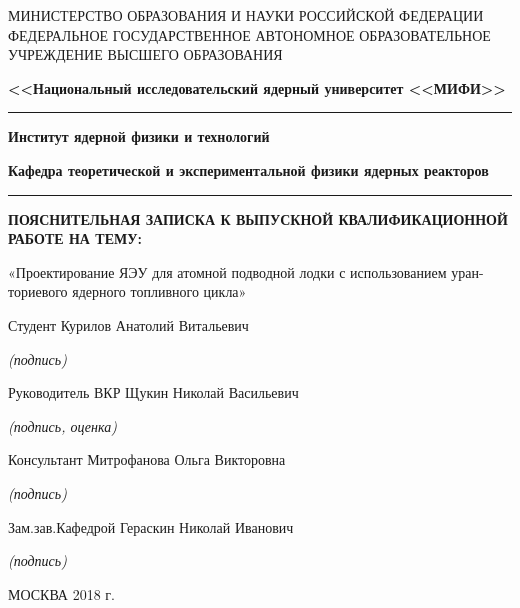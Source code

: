 \begin{center}
	\small{МИНИСТЕРСТВО ОБРАЗОВАНИЯ И НАУКИ РОССИЙСКОЙ ФЕДЕРАЦИИ}
	\footnotesize{ФЕДЕРАЛЬНОЕ ГОСУДАРСТВЕННОЕ АВТОНОМНОЕ ОБРАЗОВАТЕЛЬНОЕ УЧРЕЖДЕНИЕ 
		ВЫСШЕГО ОБРАЗОВАНИЯ}
	
	
	\large{\textbf{<<Национальный исследовательский ядерный университет <<МИФИ>>}}
	
	\rule{\textwidth}{.15mm}
	
	\textbf{Институт ядерной физики и технологий}
	
	\textbf{Кафедра теоретической и экспериментальной физики ядерных реакторов}
	
	\rule{\textwidth}{.15mm}
	
	\vspace{1cm}
	
	\textbf{ПОЯСНИТЕЛЬНАЯ ЗАПИСКА
		К ВЫПУСКНОЙ КВАЛИФИКАЦИОННОЙ РАБОТЕ НА ТЕМУ:}
	
	«Проектирование ЯЭУ для атомной подводной лодки с использованием уран-ториевого ядерного топливного цикла» 
	
\end{center}

\vspace{1cm}
Студент \hfill Курилов Анатолий Витальевич \hfill\underline{\hspace{4cm}}

\hfill \textit {(подпись)\hspace{7mm}}

Руководитель ВКР \hfill Щукин Николай Васильевич \hfill\underline{\hspace{4cm}}

\hfill \textit {(подпись, оценка)\hspace{0mm}}

Консультант \hfill Митрофанова Ольга Викторовна  \hfill\underline{\hspace{4cm}}

\hfill \textit {(подпись)\hspace{7mm}}

Зам.зав.Кафедрой  \hfill Гераскин Николай Иванович  \hfill\underline{\hspace{4cm}}

\hfill \textit {(подпись)\hspace{7mm}}




\vfill

\centering МОСКВА 2018 г.

\pagebreak